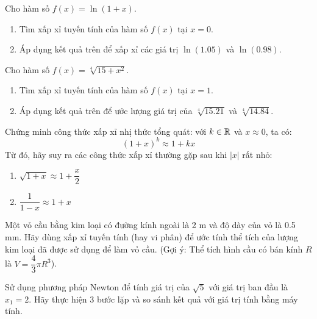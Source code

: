 \begin{exercise}
Cho hàm số $f(x) = \ln(1 + x)$.
\begin{enumerate}[label=(\alph*)]
    \item Tìm xấp xỉ tuyến tính của hàm số $f(x)$ tại $x=0$.
    \item Áp dụng kết quả trên để xấp xỉ các giá trị $\ln(1.05)$ và $\ln(0.98)$.
\end{enumerate}
\end{exercise}

\begin{exercise}
Cho hàm số $f(x) = \sqrt[4]{15 + x^2}$.
\begin{enumerate}[label=(\alph*)]
    \item Tìm xấp xỉ tuyến tính của hàm số $f(x)$ tại $x=1$.
    \item Áp dụng kết quả trên để ước lượng giá trị của $\sqrt[4]{15.21}$ và $\sqrt[4]{14.84}$.
\end{enumerate}
\end{exercise}

\begin{exercise}
Chứng minh công thức xấp xỉ nhị thức tổng quát: với $k \in \mathbb{R}$ và $x \approx 0$, ta có:
$$ (1+x)^k \approx 1 + kx $$
Từ đó, hãy suy ra các công thức xấp xỉ thường gặp sau khi $|x|$ rất nhỏ:
\begin{enumerate}[label=(\alph*)]
    \item $\sqrt{1+x} \approx 1 + \dfrac{x}{2}$
    \item $\dfrac{1}{1-x} \approx 1 + x$
\end{enumerate}
\end{exercise}

\begin{exercise}
Một vỏ cầu bằng kim loại có đường kính ngoài là 2 m và độ dày của vỏ là 0.5 mm. Hãy dùng xấp xỉ tuyến tính (hay vi phân) để ước tính thể tích của lượng kim loại đã được sử dụng để làm vỏ cầu. (Gợi ý: Thể tích hình cầu có bán kính $R$ là $V = \dfrac{4}{3}\pi R^3$).
\end{exercise}

\begin{exercise}
Sử dụng phương pháp Newton để tính giá trị của $\sqrt{5}$ với giá trị ban đầu là $x_1 = 2$. Hãy thực hiện 3 bước lặp và so sánh kết quả với giá trị tính bằng máy tính.
\end{exercise}


